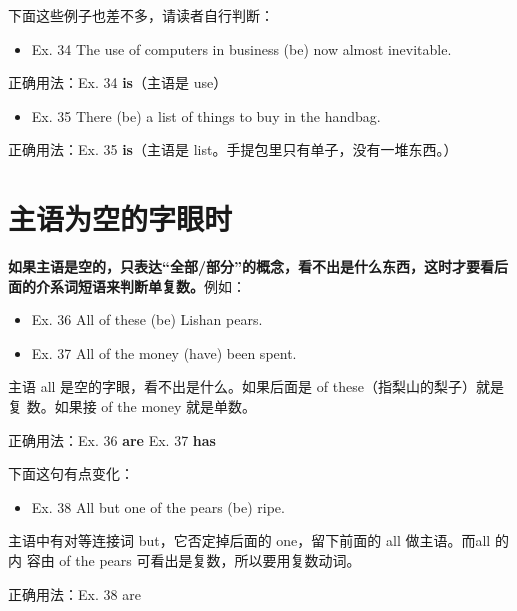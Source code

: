\documentclass{yufa}
\begin{document}
下面这些例子也差不多，请读者自行判断：
\begin{mybox}
\begin{itemize}
\item   Ex. 34 The use of computers in business (be) now almost inevitable.
\end{itemize}

\tcblower

正确用法：Ex. 34 \textbf{is}（主语是 use）
\end{mybox}


\begin{mybox}
\begin{itemize}
\item   Ex. 35 There (be) a list of things to buy in the handbag.
\end{itemize}

\tcblower

正确用法：Ex. 35 \textbf{is}（主语是 list。手提包里只有单子，没有一堆东西。）
\end{mybox}

\section{主语为空的字眼时}

\textbf{如果主语是空的，只表达“全部/部分”的概念，看不出是什么东西，这时才要看后面的介系词短语来判断单复数。}例如：
\begin{mybox}

\begin{itemize}
\item   Ex. 36 All of these (be) Lishan pears.
\item   Ex. 37 All of the money (have) been spent.
\end{itemize}

主语 all 是空的字眼，看不出是什么。如果后面是 of these（指梨山的梨子）就是复
数。如果接 of the money 就是单数。

\tcblower

正确用法：Ex. 36 \textbf{are} \qquad\quad Ex. 37 \textbf{has}
\end{mybox}

下面这句有点变化：
\begin{mybox}

\begin{itemize}
\item   Ex. 38 All but one of the pears (be) ripe.
\end{itemize}

主语中有对等连接词 but，它否定掉后面的 one，留下前面的 all 做主语。而all 的内
容由 of the pears 可看出是复数，所以要用复数动词。

\tcblower

正确用法：Ex. 38 are
\end{mybox}
\end{document}
